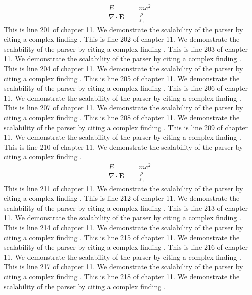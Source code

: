 \begin{align*}
  E &= mc^2 \\
  \nabla \cdot \mathbf{E} &= \frac{\rho}{\varepsilon_0}
\end{align*}
This is line 201 of chapter 11. We demonstrate the scalability of the parser by citing a complex finding \cite{ref11_201}.
This is line 202 of chapter 11. We demonstrate the scalability of the parser by citing a complex finding \cite{ref11_202}.
This is line 203 of chapter 11. We demonstrate the scalability of the parser by citing a complex finding \cite{ref11_203}.
This is line 204 of chapter 11. We demonstrate the scalability of the parser by citing a complex finding \cite{ref11_204}.
This is line 205 of chapter 11. We demonstrate the scalability of the parser by citing a complex finding \cite{ref11_205}.
This is line 206 of chapter 11. We demonstrate the scalability of the parser by citing a complex finding \cite{ref11_206}.
This is line 207 of chapter 11. We demonstrate the scalability of the parser by citing a complex finding \cite{ref11_207}.
This is line 208 of chapter 11. We demonstrate the scalability of the parser by citing a complex finding \cite{ref11_208}.
This is line 209 of chapter 11. We demonstrate the scalability of the parser by citing a complex finding \cite{ref11_209}.
This is line 210 of chapter 11. We demonstrate the scalability of the parser by citing a complex finding \cite{ref11_210}.
\begin{align*}
  E &= mc^2 \\
  \nabla \cdot \mathbf{E} &= \frac{\rho}{\varepsilon_0}
\end{align*}
This is line 211 of chapter 11. We demonstrate the scalability of the parser by citing a complex finding \cite{ref11_211}.
This is line 212 of chapter 11. We demonstrate the scalability of the parser by citing a complex finding \cite{ref11_212}.
This is line 213 of chapter 11. We demonstrate the scalability of the parser by citing a complex finding \cite{ref11_213}.
This is line 214 of chapter 11. We demonstrate the scalability of the parser by citing a complex finding \cite{ref11_214}.
This is line 215 of chapter 11. We demonstrate the scalability of the parser by citing a complex finding \cite{ref11_215}.
This is line 216 of chapter 11. We demonstrate the scalability of the parser by citing a complex finding \cite{ref11_216}.
This is line 217 of chapter 11. We demonstrate the scalability of the parser by citing a complex finding \cite{ref11_217}.
This is line 218 of chapter 11. We demonstrate the scalability of the parser by citing a complex finding \cite{ref11_218}.
